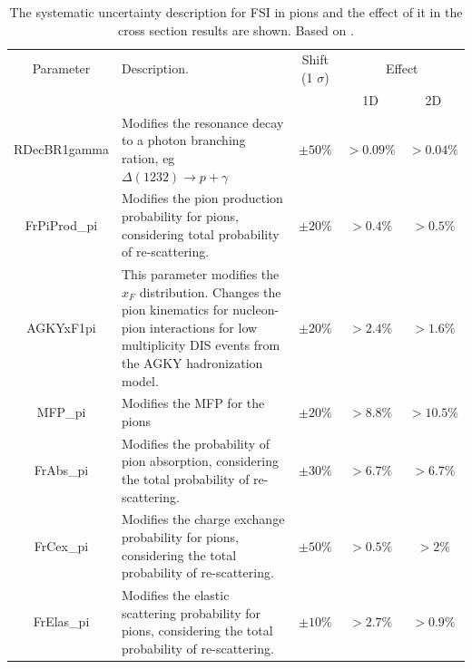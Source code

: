 \begin{table}[!htb]
    \centering
    \begin{tabular}{c|p{2in}|c|c|c}
        \hline 
        Parameter & Description.  & Shift (1 $\sigma$) & \multicolumn{2}{c}{Effect} \\
         & & & 1D & 2D \\
        \hline  
        RDecBR1gamma & Modifies the resonance decay to a photon branching ration, eg $\Delta(1232)\rightarrow p + \gamma$& $\pm50\%$ & $>0.09\%$ & $>0.04\%$\\ \hline
        FrPiProd\_pi & Modifies the pion production probability for pions, considering total probability of re-scattering. & $\pm20\%$ & $>0.4\%$ & $>0.5\%$ \\ \hline
        AGKYxF1pi & This parameter modifies the $x_F$ distribution. Changes the pion kinematics for nucleon-pion interactions for low multiplicity DIS events from the AGKY hadronization model.  & $\pm20\%$ & $>2.4\%$ & $>1.6\%$\\ \hline
        MFP\_pi & Modifies the MFP for the pions & $\pm20\%$ & $>8.8\%$ & $>10.5\%$\\ \hline
        FrAbs\_pi & Modifies the probability of pion absorption, considering the total probability of re-scattering. & $\pm30\%$ & $>6.7\%$ & $>6.7\%$ \\ \hline 
        FrCex\_pi & Modifies the charge exchange probability for pions, considering the total probability of re-scattering. & $\pm50\%$ & $>0.5\%$ & $>2\%$\\ \hline
        FrElas\_pi & Modifies the elastic scattering probability for pions, considering the total probability of re-scattering. & $\pm10\%$ & $>2.7\%$ & $>0.9\%$ \\ \hline
        

        
    \end{tabular}
    \caption{The systematic uncertainty description for FSI in pions and the effect of it in the cross section results are shown. Based on \cite{GENIEUnc}.}
    \label{tab:ErrorAnalysis:SystematicUnc:FSIPi}
\end{table}


